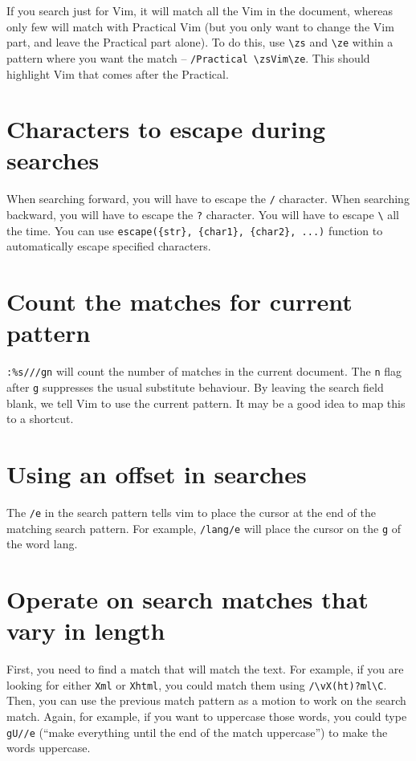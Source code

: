 If you search just for Vim, it will match all the Vim in the document, whereas only few will match with Practical Vim (but you only want to change the Vim part, and leave the Practical part alone).
To do this, use \verb|\zs| and \verb|\ze| within a pattern where you want the match -- \verb|/Practical \zsVim\ze|.
This should highlight Vim that comes after the Practical.

\section{Characters to escape during searches}

When searching forward, you will have to escape the \verb|/| character.
When searching backward, you will have to escape the \verb|?| character.
You will have to escape \verb|\| all the time.
You can use \verb|escape({str}, {char1}, {char2}, ...)| function to automatically escape specified characters.

\section{Count the matches for current pattern}

\verb|:%s///gn| will count the number of matches in the current document.
The \verb|n| flag after \verb|g| suppresses the usual substitute behaviour.
By leaving the search field blank, we tell Vim to use the current pattern.
It may be a good idea to map this to a shortcut.

\section{Using an offset in searches}

The \verb|/e| in the search pattern tells vim to place the cursor at the end of the matching search pattern.
For example, \verb|/lang/e| will place the cursor on the \verb|g| of the word lang.

\section{Operate on search matches that vary in length}

First, you need to find a match that will match the text.
For example, if you are looking for either \verb|Xml| or \verb|Xhtml|, you could match them using \verb|/\vX(ht)?ml\C|.
Then, you can use the previous match pattern as a motion to work on the search match.
Again, for example, if you want to uppercase those words, you could type \verb|gU//e| (``make everything until the end of the match uppercase'') to make the words uppercase.


